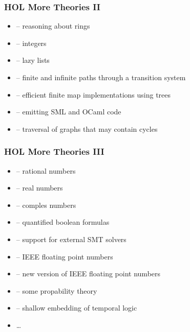 \begin{frame}
\frametitle{HOL More Theories II}

\begin{itemize}
\item {} -- reasoning about rings
\item {} -- integers
\item {} -- lazy lists
\item {} -- finite and infinite paths through a transition system
\item {} -- efficient finite map implementations using trees
\item {} -- emitting SML and OCaml code
\item {} -- traversal of graphs that may contain cycles
\end{itemize}
\end{frame}

\begin{frame}
\frametitle{HOL More Theories III}

\begin{itemize}
\item {} -- rational numbers
\item {} -- real numbers
\item {} -- comples numbers
\item {} -- quantified boolean formulas
\item {} -- support for external SMT solvers
\item {} -- IEEE floating point numbers
\item {} -- new version of IEEE floating point numbers
\item {} -- some propability theory
\item {} -- shallow embedding of temporal logic
\item \ldots
\end{itemize}
\end{frame}


